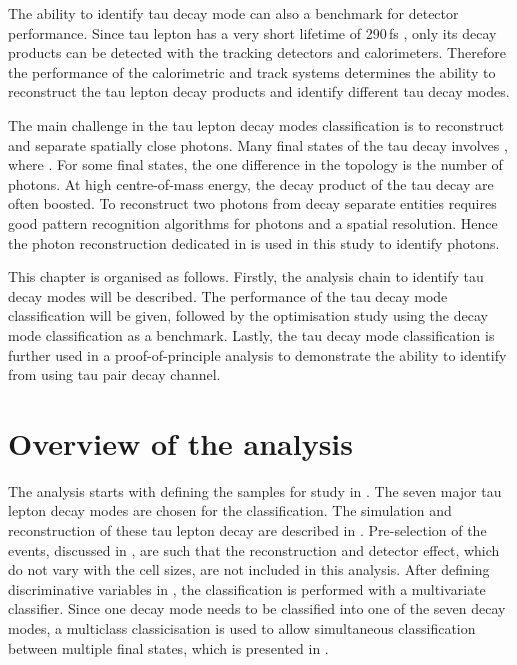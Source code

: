 The ability to identify tau decay mode can also a benchmark for detector performance. Since tau lepton has a very short lifetime of 290\,fs \cite{Abreu:1991jn,Agashe:2014kda}, only its decay products can be detected with the tracking detectors and calorimeters. Therefore the performance of the calorimetric and track systems determines the ability to reconstruct the tau lepton decay products and identify different tau decay modes.


The main challenge in the tau lepton decay modes  classification is to reconstruct and separate spatially close photons. Many final states of the tau decay involves \Ppizero, where \HepProcess{\Ppizero \to \Pphoton \Pphoton}. For some final states, the one difference in the topology is the number of photons. At high centre-of-mass energy, the decay product of the tau decay are often boosted.  To reconstruct two photons from \Ppizero decay  separate entities requires good pattern recognition algorithms for photons and a \ECAL spatial resolution. Hence the photon reconstruction dedicated in  is used in this study to identify photons.

This chapter is organised as follows. Firstly, the analysis chain to identify tau decay modes will be described. The performance of the tau decay mode classification will be given, followed by the \ECAL optimisation study using the decay mode classification as a benchmark. Lastly, the  tau decay mode classification is further used in a proof-of-principle analysis to demonstrate the ability to identify \PHiggs from \PZ using  tau pair decay channel.

%



\section{Overview of the analysis}

The analysis starts with defining the samples for study in . The seven major tau lepton decay modes are chosen for the classification. The simulation and reconstruction of these tau lepton decay are described in .  Pre-selection of the events, discussed in , are such that the reconstruction and detector effect, which do not vary with the \ECAL cell sizes, are not included in this analysis. After defining discriminative variables in , the classification is performed with a multivariate classifier. Since one decay mode needs to be classified into one of the seven decay modes, a multiclass classicisation is used to allow simultaneous classification between  multiple final states, which is presented in .

